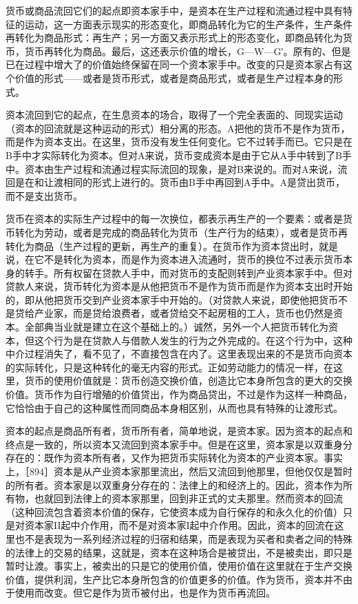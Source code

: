 货币或商品流回它们的起点即资本家手中，是资本在生产过程和流通过程中具有特征的运动，这一方面表示现实的形态变化，即商品转化为它的生产条件，生产条件再转化为商品形式：再生产；另一方面又表示形式上的形态变化，即商品转化为货币，货币再转化为商品。最后，这还表示价值的增长，G—W—G′。原有的、但是已在过程中增大了的价值始终保留在同一个资本家手中。改变的只是资本家占有这个价值的形式——或者是货币形式，或者是商品形式，或者是生产过程本身的形式。

资本流回到它的起点，在生息资本的场合，取得了一个完全表面的、同现实运动（资本的回流就是这种运动的形式）相分离的形态。A把他的货币不是作为货币，而是作为资本支出。在这里，货币没有发生任何变化。它不过转手而已。它只是在B手中才实际转化为资本。但对A来说，货币变成资本是由于它从A手中转到了B手中。资本由生产过程和流通过程实际流回的现象，是对B来说的。而对A来说，流回是在和让渡相同的形式上进行的。货币由B手中再回到A手中。A是贷出货币，而不是支出货币。

货币在资本的实际生产过程中的每一次换位，都表示再生产的一个要素：或者是货币转化为劳动，或者是完成的商品转化为货币（生产行为的结束），或者是货币再转化为商品（生产过程的更新，再生产的重复）。在货币作为资本贷出时，就是说，在它不是转化为资本，而是作为资本进入流通时，货币的换位不过表示货币本身的转手。所有权留在贷款人手中，而对货币的支配则转到产业资本家手中。但对贷款人来说，货币转化为资本是从他把货币不是作为货币而是作为资本支出时开始的，即从他把货币交到产业资本家手中开始的。（对贷款人来说，即使他把货币不是贷给产业家，而是贷给浪费者，或者贷给交不起房租的工人，货币也仍然是资本。全部典当业就是建立在这个基础上的。）诚然，另外一个人把货币转化为资本，但这个行为是在贷款人与借款人发生的行为之外完成的。在这个行为中，这种中介过程消失了，看不见了，不直接包含在内了。这里表现出来的不是货币向资本的实际转化，只是这种转化的毫无内容的形式。正如劳动能力的情况一样，在这里，货币的使用价值就是：货币创造交换价值，创造比它本身所包含的更大的交换价值。货币作为自行增殖的价值贷出，作为商品贷出，不过是作为这样一种商品，它恰恰由于自己的这种属性而同商品本身相区别，从而也具有特殊的让渡形式。

资本的起点是商品所有者，货币所有者，简单地说，是资本家。因为资本的起点和终点是一致的，所以资本又流回到资本家手中。但是在这里，资本家是以双重身分存在的：既作为资本所有者，又作为把货币实际转化为资本的产业资本家。事实上，［894］资本是从产业资本家那里流出，然后又流回到他那里，但他仅仅是暂时的所有者。资本家是以双重身分存在的：法律上的和经济上的。因此，资本作为所有物，也就回到法律上的资本家那里，回到非正式的丈夫那里。然而资本的回流（这种回流包含着资本价值的保存，它使资本成为自行保存的和永久化的价值）只是对资本家II起中介作用，而不是对资本家I起中介作用。因此，资本的回流在这里也不是表现为一系列经济过程的归宿和结果，而是表现为买者和卖者之间的特殊的法律上的交易的结果，这就是，资本在这种场合是被贷出，不是被卖出，即只是暂时让渡。事实上，被卖出的只是它的使用价值，使用价值在这里就在于生产交换价值，提供利润，生产比它本身所包含的价值更多的价值。作为货币，资本并不由于使用而改变。但它是作为货币被付出，也是作为货币再流回。

